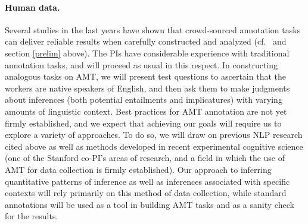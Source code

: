 \documentclass[10pt]{article}
\begin{document}


\vspace{-.15in}
\paragraph{Human data.}
Several studies in the last years have shown that crowd-sourced annotation tasks can deliver reliable results when carefully constructed and analyzed (cf.\ \cite{snow:08,munroetal2010} and section \ref{prelim} above). 
The PIs have considerable experience with traditional annotation tasks, and will proceed as usual in this respect.
In constructing analogous tasks on AMT, we will present test questions to ascertain that the workers are native speakers of English, and then ask them to make judgments about inferences (both potential entailments and implicatures) with varying amounts of linguistic context.
Best practices for AMT annotation are not yet firmly established, and we expect that achieving our goals will require us to explore a variety of approaches.
To do so, we will draw on previous NLP research cited above as well as methods developed in recent experimental cognitive science (one of the Stanford co-PI's areas of research, and a field in which the use of AMT for data collection is firmly established).
Our approach to inferring quantitative patterns of inference as well as inferences associated with specific contexts will rely primarily on this method of data collection, while standard annotations will be used as a tool in building AMT tasks and as a sanity check for the results. 
\end{document}
